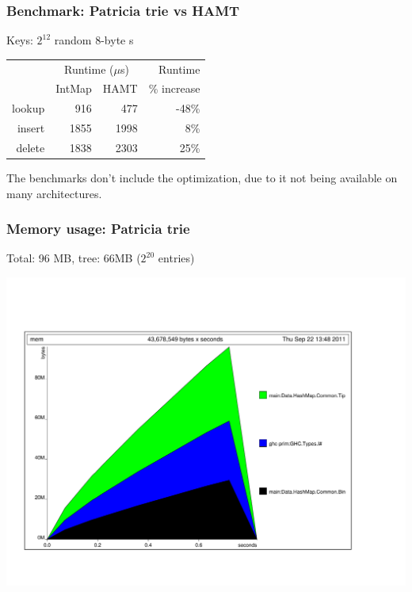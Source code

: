\documentclass[xetex,mathserif,serif]{beamer}
\newcommand{\code}[1]{\mbox{\texttt{\small{\color{CodeColor}{#1}}}}}
\begin{document}
\begin{frame}
  \frametitle{Benchmark: Patricia trie vs HAMT}

  Keys: $2^{12}$ random 8-byte \code{ByteString}s

  \bigskip
  \begin{center}
  \begin{tabular}{r|rrr}
                  & \multicolumn{2}{c}{Runtime ($\mu$s)} & Runtime \\
                  & IntMap & HAMT                      & \% increase \\
    \hline lookup &  916 &  477 & -48\% \\
           insert & 1855 & 1998 & 8\% \\
           delete & 1838 & 2303 & 25\% \\
  \end{tabular}
  \end{center}

  The benchmarks don't include the \code{POPCNT} optimization, due to
  it not being available on many architectures.
\end{frame}

\begin{frame}
  \frametitle{Memory usage: Patricia trie}
  Total: 96 MB, tree: 66MB ($2^{20}$ \code{Int} entries)
  \begin{center}
  \includegraphics[angle=90,scale=0.3]{patricia-mem.pdf}
  \end{center}
\end{frame}
\end{document}
